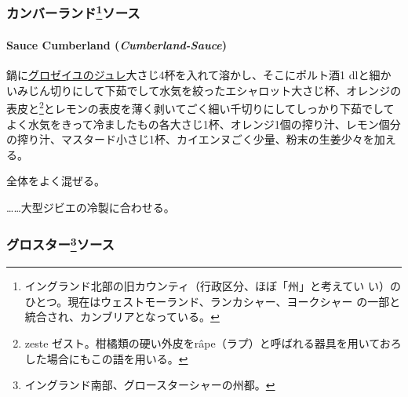 \begin{recette}
{\subsubsection[カンバーランドソース]{\texorpdfstring{カンバーランド\footnote{イングランド北部の旧カウンティ（行政区分、ほぼ「州」と考えてい
  い）のひとつ。現在はウェストモーランド、ランカシャー、ヨークシャー
  の一部と統合され、カンブリアとなっている。}ソース}{カンバーランドソース}}\label{ux30abux30f3ux30d0ux30fcux30e9ux30f3ux30c959ux30bdux30fcux30b9}}

\hypertarget{cumberland-sauce}{%
\paragraph{\texorpdfstring{Sauce Cumberland
(\emph{Cumberland-Sauce})}{Sauce Cumberland (Cumberland-Sauce)}}\label{cumberland-sauce}}


鍋に\protect\hyperlink{}{グロゼイユのジュレ}大さじ4杯を入れて溶かし、そこにポルト酒1
dlと細かいみじん切りにして下茹でして水気を絞ったエシャロット大さじ\undemi{}杯、オレンジの表皮と\footnote{zeste
  ゼスト。柑橘類の硬い外皮をrâpe（ラプ）と呼ばれる器具を用いておろした場合にもこの語を用いる。}とレモンの表皮を薄く剥いてごく細い千切りにしてしっかり下茹でしてよく水気をきって冷ましたもの各大さじ1杯、オレンジ1個の搾り汁、レモン\undemi{}個分の搾り汁、マスタード小さじ1杯、カイエンヌごく少量、粉末の生姜少々を加える。

全体をよく混ぜる。

\ldots{}\ldots{}大型ジビエの冷製に合わせる。

\maeaki

\hypertarget{ux30b0ux30edux30b9ux30bfux30fc61ux30bdux30fcux30b9}{%
\subsubsection[グロスターソース]{\texorpdfstring{グロスター\footnote{イングランド南部、グロースターシャーの州都。}ソース}{グロスターソース}}\label{ux30b0ux30edux30b9ux30bfux30fc61ux30bdux30fcux30b9}}


\end{recette}
